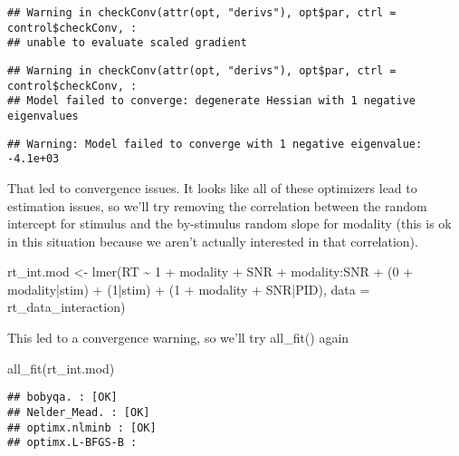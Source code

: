 \documentclass[
]{article}
\newenvironment{Shaded}{\begin{snugshade}}{\end{snugshade}}
\newcommand{\AttributeTok}[1]{\textcolor[rgb]{0.77,0.63,0.00}{#1}}
\newcommand{\DecValTok}[1]{\textcolor[rgb]{0.00,0.00,0.81}{#1}}
\newcommand{\FunctionTok}[1]{\textcolor[rgb]{0.00,0.00,0.00}{#1}}
\newcommand{\NormalTok}[1]{#1}
\newcommand{\OtherTok}[1]{\textcolor[rgb]{0.56,0.35,0.01}{#1}}
\newcommand{\SpecialCharTok}[1]{\textcolor[rgb]{0.00,0.00,0.00}{#1}}
\begin{document}
\begin{verbatim}
## Warning in checkConv(attr(opt, "derivs"), opt$par, ctrl = control$checkConv, :
## unable to evaluate scaled gradient
\end{verbatim}

\begin{verbatim}
## Warning in checkConv(attr(opt, "derivs"), opt$par, ctrl = control$checkConv, :
## Model failed to converge: degenerate Hessian with 1 negative eigenvalues
\end{verbatim}

\begin{verbatim}
## Warning: Model failed to converge with 1 negative eigenvalue: -4.1e+03
\end{verbatim}

That led to convergence issues. It looks like all of these optimizers
lead to estimation issues, so we'll try removing the correlation between
the random intercept for stimulus and the by-stimulus random slope for
modality (this is ok in this situation because we aren't actually
interested in that correlation).

\begin{Shaded}
\begin{Highlighting}[]
\NormalTok{rt\_int.mod }\OtherTok{\textless{}{-}} \FunctionTok{lmer}\NormalTok{(RT }\SpecialCharTok{\textasciitilde{}} \DecValTok{1} \SpecialCharTok{+}\NormalTok{ modality }\SpecialCharTok{+}\NormalTok{ SNR }\SpecialCharTok{+}\NormalTok{ modality}\SpecialCharTok{:}\NormalTok{SNR }\SpecialCharTok{+}
\NormalTok{                     (}\DecValTok{0} \SpecialCharTok{+}\NormalTok{ modality}\SpecialCharTok{|}\NormalTok{stim) }\SpecialCharTok{+}\NormalTok{ (}\DecValTok{1}\SpecialCharTok{|}\NormalTok{stim) }\SpecialCharTok{+}\NormalTok{ (}\DecValTok{1} \SpecialCharTok{+}\NormalTok{ modality }\SpecialCharTok{+}\NormalTok{ SNR}\SpecialCharTok{|}\NormalTok{PID), }
                   \AttributeTok{data =}\NormalTok{ rt\_data\_interaction)}
\end{Highlighting}
\end{Shaded}

This led to a convergence warning, so we'll try all\_fit() again

\begin{Shaded}
\begin{Highlighting}[]
\FunctionTok{all\_fit}\NormalTok{(rt\_int.mod)}
\end{Highlighting}
\end{Shaded}

\begin{verbatim}
## bobyqa. : [OK]
## Nelder_Mead. : [OK]
## optimx.nlminb : [OK]
## optimx.L-BFGS-B :
\end{verbatim}
\end{document}
